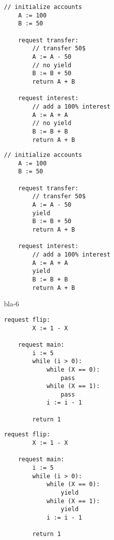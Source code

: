 \noindent
\begin{minipage}[t]{0.45\textwidth}
	\begin{lstlisting}[caption={bank (serializable)}]
    // initialize accounts
    A := 100
    B := 50
    
    request transfer: 
        // transfer 50$
        A := A - 50
        // no yield
        B := B + 50
        return A + B
			
    request interest: 
        // add a 100% interest
        A := A + A
        // no yield
        B := B + B
        return A + B	      		        
		\end{lstlisting}
\end{minipage}
\hfill
\begin{minipage}[t]{0.45\textwidth}
	\begin{lstlisting}[caption={bank with yields (non serializable)}]
    // initialize accounts
    A := 100
    B := 50
		
    request transfer: 
        // transfer 50$
        A := A - 50
        yield
        B := B + 50
        return A + B

    request interest: 
        // add a 100% interest
        A := A + A
        yield
        B := B + B
        return A + B	      		        
	\end{lstlisting}
\end{minipage}
	


bla-6


\noindent
\begin{minipage}[t]{0.45\textwidth}
	\begin{lstlisting}[caption={Complex while (serializable)}]
    request flip: 
        X := 1 - X 
    
    request main:
        i := 5
        while (i > 0):
            while (X == 0):
                pass
            while (X == 1):
                pass
            i := i - 1
        
        return 1       
		\end{lstlisting}
\end{minipage}%
\hfill
\begin{minipage}[t]{0.45\textwidth}
	\begin{lstlisting}[caption={Complex while with yields (not serializable)}]
    request flip: 
        X := 1 - X 

    request main:
        i := 5
        while (i > 0):
            while (X == 0):
                yield
            while (X == 1):
                yield
            i := i - 1

        return 1        
			\end{lstlisting}
\end{minipage}



\newpage